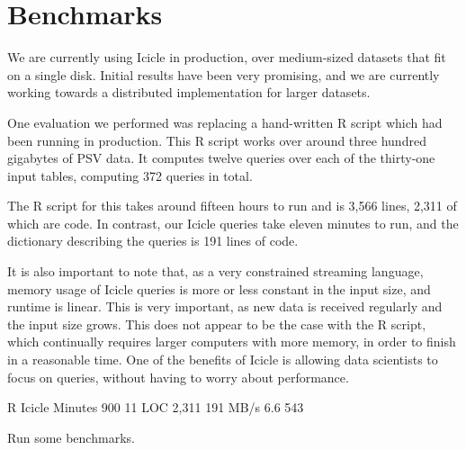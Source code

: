 \section{Benchmarks}
\label{s:Benchmarks}

We are currently using Icicle in production, over medium-sized datasets that fit on a single disk.
Initial results have been very promising, and we are currently working towards a distributed implementation for larger datasets.

One evaluation we performed was replacing a hand-written R script which had been running in production.
This R script works over around three hundred gigabytes of PSV data.
It computes twelve queries over each of the thirty-one input tables, computing 372 queries in total.

The R script for this takes around fifteen hours to run and is 3,566 lines, 2,311 of which are code.
In contrast, our Icicle queries take eleven minutes to run, and the dictionary describing the queries is 191 lines of code.

It is also important to note that, as a very constrained streaming language, memory usage of Icicle queries is more or less constant in the input size, and runtime is linear.
This is very important, as new data is received regularly and the input size grows.
This does not appear to be the case with the R script, which continually requires larger computers with more memory, in order to finish in a reasonable time.
One of the benefits of Icicle is allowing data scientists to focus on queries, without having to worry about performance.

\begin{code}
          R       Icicle
Minutes   900         11
LOC       2,311      191
MB/s      6.6        543
\end{code}


Run some benchmarks.


